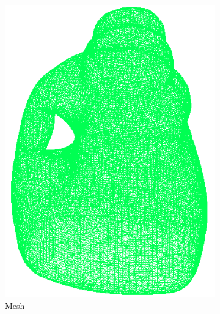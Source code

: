 \begin{figure}[!t]
  \centering
  \begin{subfigure}{0.3\linewidth}
    \centering
    \includegraphics[width=\linewidth]{Figures/ObjRecog/detergent_mesh.png}
    \caption{Mesh}
    \label{fig:objrecog:meshcloudgrid:mesh}
  \end{subfigure}
  \begin{subfigure}{0.3\linewidth}
    \centering

\end{subfigure}
\end{figure}
